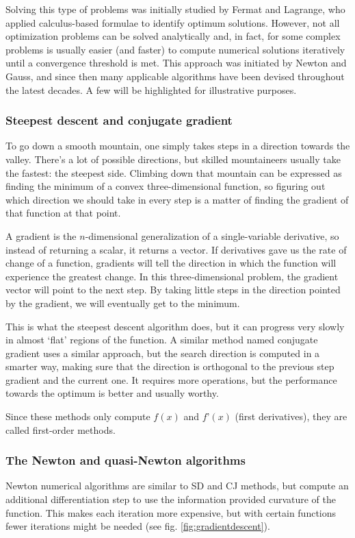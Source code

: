 Solving this type of problems was initially studied by Fermat and Lagrange, who applied calculus-based formulae to identify optimum solutions. However, not all optimization problems can be solved analytically and, in fact, for some complex problems is usually easier (and faster) to compute numerical solutions iteratively until a convergence threshold is met. This approach was initiated by Newton and Gauss, and since then many applicable algorithms have been devised throughout the latest decades. A few will be highlighted for illustrative purposes.

\subsubsection{Steepest descent and conjugate gradient}
To go down a smooth mountain, one simply takes steps in a direction towards the valley. There’s a lot of possible directions, but skilled mountaineers usually take the fastest: the steepest side. Climbing down that mountain can be expressed as finding the minimum of a convex three-dimensional function, so figuring out which direction we should take in every step is a matter of finding the gradient of that function at that point.

A gradient is the $n$-dimensional generalization of a single-variable derivative, so instead of returning a scalar, it returns a vector. If derivatives gave us the rate of change of a function, gradients will tell the direction in which the function will experience the greatest change. In this three-dimensional problem, the gradient vector will point to the next step. By taking little steps in the direction pointed by the gradient, we will eventually get to the minimum.

This is what the steepest descent algorithm does, but it can progress very slowly in almost ‘flat’ regions of the function. A similar method named conjugate gradient uses a similar approach, but the search direction is computed in a smarter way, making sure that the direction is orthogonal to the previous step gradient and the current one. It requires more operations, but the performance towards the optimum is better and usually worthy.

Since these methods only compute $f(x)$ and $f’(x)$ (first derivatives), they are called first-order methods.

\subsubsection{The Newton and quasi-Newton algorithms}
Newton numerical algorithms are similar to SD and CJ methods, but compute an additional differentiation step to use the information provided curvature of the function. This makes each iteration more expensive, but with certain functions fewer iterations might be needed (see fig. \ref{fig:gradientdescent}).

